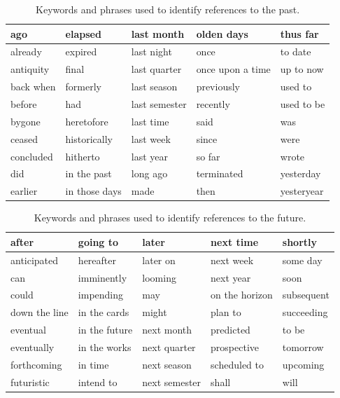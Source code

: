 \documentclass[10pt]{article}
\begin{document}
  \begin{table}[h!]
    \centering
    \caption{Keywords and phrases used to identify references to the past.}
    \begin{tabular}{l l l l l}
    \toprule
    ago & elapsed & last month & olden days & thus far \\
    \midrule
    already & expired & last night & once & to date \\
    \midrule
    antiquity & final & last quarter & once upon a time & up to now \\
    \midrule
    back when & formerly & last season & previously & used to \\
    \midrule
    before & had & last semester & recently & used to be \\
    \midrule
    bygone & heretofore & last time & said & was \\
    \midrule
    ceased & historically & last week & since & were \\
    \midrule
    concluded & hitherto & last year & so far & wrote \\
    \midrule
    did & in the past & long ago & terminated & yesterday \\
    \midrule
    earlier & in those days & made & then & yesteryear \\
    \bottomrule
    \end{tabular}
    \label{tab:keywords_past}
  \end{table}
  
  \begin{table}[h!]
    \centering
    \caption{Keywords and phrases used to identify references to the future.}
    \begin{tabular}{l l l l l}
        \toprule
        after & going to & later & next time & shortly \\
        \midrule
        anticipated & hereafter & later on & next week & some day \\
        \midrule
        can & imminently & looming & next year & soon \\
        \midrule
        could & impending & may & on the horizon & subsequent \\
        \midrule
        down the line & in the cards & might & plan to & succeeding \\
        \midrule
        eventual & in the future & next month & predicted & to be \\
        \midrule
        eventually & in the works & next quarter & prospective & tomorrow \\
        \midrule
        forthcoming & in time & next season & scheduled to & upcoming \\
        \midrule
        futuristic & intend to & next semester & shall & will \\
        \bottomrule
    \end{tabular}
    \label{tab:keywords_future}
  \end{table}
\end{document}
